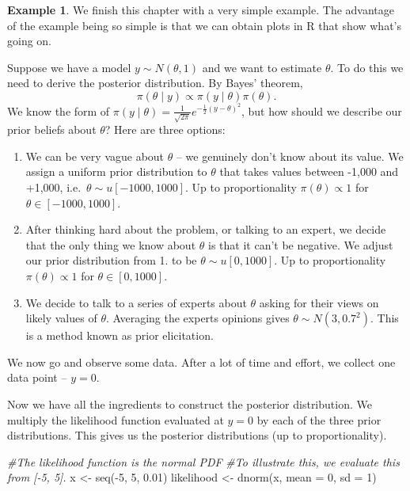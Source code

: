 \documentclass[
]{book}
\newenvironment{Shaded}{\begin{snugshade}}{\end{snugshade}}
\newcommand{\AttributeTok}[1]{\textcolor[rgb]{0.77,0.63,0.00}{#1}}
\newcommand{\CommentTok}[1]{\textcolor[rgb]{0.56,0.35,0.01}{\textit{#1}}}
\newcommand{\DecValTok}[1]{\textcolor[rgb]{0.00,0.00,0.81}{#1}}
\newcommand{\FloatTok}[1]{\textcolor[rgb]{0.00,0.00,0.81}{#1}}
\newcommand{\FunctionTok}[1]{\textcolor[rgb]{0.00,0.00,0.00}{#1}}
\newcommand{\NormalTok}[1]{#1}
\newcommand{\OtherTok}[1]{\textcolor[rgb]{0.56,0.35,0.01}{#1}}
\newcommand{\SpecialCharTok}[1]{\textcolor[rgb]{0.00,0.00,0.00}{#1}}
\theoremstyle{definition}
\theoremstyle{definition}
\newtheorem{example}{Example}[chapter]
\theoremstyle{definition}
\theoremstyle{definition}
\theoremstyle{remark}
\begin{document}
\begin{example}

We finish this chapter with a very simple example. The advantage of the example being so simple is that we can obtain plots in R that show what's going on.

Suppose we have a model \(y \sim N(\theta, 1)\) and we want to estimate \(\theta\). To do this we need to derive the posterior distribution. By Bayes' theorem,
\[
\pi(\theta \mid y) \propto \pi(y \mid \theta) \pi(\theta).
\]
We know the form of \(\pi(y \mid \theta) = \frac{1}{\sqrt{2\pi}}e^{-\frac{1}{2}(y - \theta)^2}\), but how should we describe our prior beliefs about \(\theta\)? Here are three options:

\begin{enumerate}
\def\labelenumi{\arabic{enumi}.}
\item
  We can be very vague about \(\theta\) -- we genuinely don't know about its value. We assign a uniform prior distribution to \(\theta\) that takes values between -1,000 and +1,000, i.e.~\(\theta \sim u[-1000, 1000]\). Up to proportionality \(\pi(\theta) \propto 1\) for \(\theta \in [-1000, 1000]\).
\item
  After thinking hard about the problem, or talking to an expert, we decide that the only thing we know about \(\theta\) is that it can't be negative. We adjust our prior distribution from 1. to be \(\theta \sim u[0, 1000]\). Up to proportionality \(\pi(\theta) \propto 1\) for \(\theta \in [0, 1000]\).
\item
  We decide to talk to a series of experts about \(\theta\) asking for their views on likely values of \(\theta\). Averaging the experts opinions gives \(\theta \sim N(3, 0.7^2)\). This is a method known as prior elicitation.
\end{enumerate}

We now go and observe some data. After a lot of time and effort, we collect one data point -- \(y = 0\).

Now we have all the ingredients to construct the posterior distribution. We multiply the likelihood function evaluated at \(y = 0\) by each of the three prior distributions. This gives us the posterior distributions (up to proportionality).

\begin{Shaded}
\begin{Highlighting}[]
\CommentTok{\#The likelihood function is the normal PDF}
\CommentTok{\#To illustrate this, we evaluate this from [{-}5, 5].}
\NormalTok{x }\OtherTok{\textless{}{-}} \FunctionTok{seq}\NormalTok{(}\SpecialCharTok{{-}}\DecValTok{5}\NormalTok{, }\DecValTok{5}\NormalTok{, }\FloatTok{0.01}\NormalTok{)}
\NormalTok{likelihood }\OtherTok{\textless{}{-}} \FunctionTok{dnorm}\NormalTok{(x, }\AttributeTok{mean =} \DecValTok{0}\NormalTok{, }\AttributeTok{sd =} \DecValTok{1}\NormalTok{)}


\end{Highlighting}
\end{Shaded}
\end{example}
\end{document}
